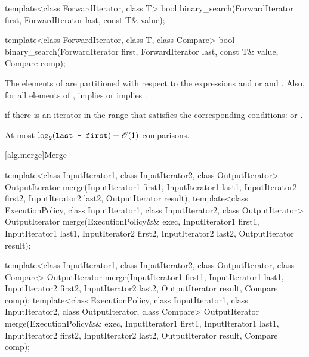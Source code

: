 %
\begin{itemdecl}
template<class ForwardIterator, class T>
  bool binary_search(ForwardIterator first, ForwardIterator last,
                     const T& value);

template<class ForwardIterator, class T, class Compare>
  bool binary_search(ForwardIterator first, ForwardIterator last,
                     const T& value, Compare comp);
\end{itemdecl}

\begin{itemdescr}
\pnum
\requires
The elements
of
are partitioned with respect to the expressions
and
or
and
.
Also, for all elements
of
\tcode{[first, last)},
implies
or
implies
.

\pnum
\returns
{}
if there is an iterator
in the range
that satisfies the corresponding conditions:
or
.

\pnum
\complexity
At most
$\log_2(\texttt{last - first}) + \mathscr{O}(1)$
comparisons.
\end{itemdescr}

[alg.merge]{Merge}

%
\begin{itemdecl}
template<class InputIterator1, class InputIterator2,
         class OutputIterator>
  OutputIterator
    merge(InputIterator1 first1, InputIterator1 last1,
          InputIterator2 first2, InputIterator2 last2,
          OutputIterator result);
template<class ExecutionPolicy, class InputIterator1, class InputIterator2,
         class OutputIterator>
  OutputIterator
    merge(ExecutionPolicy&& exec,
          InputIterator1 first1, InputIterator1 last1,
          InputIterator2 first2, InputIterator2 last2,
          OutputIterator result);

template<class InputIterator1, class InputIterator2,
         class OutputIterator, class Compare>
  OutputIterator
    merge(InputIterator1 first1, InputIterator1 last1,
          InputIterator2 first2, InputIterator2 last2,
          OutputIterator result, Compare comp);
template<class ExecutionPolicy, class InputIterator1, class InputIterator2,
         class OutputIterator, class Compare>
  OutputIterator
    merge(ExecutionPolicy&& exec,
          InputIterator1 first1, InputIterator1 last1,
          InputIterator2 first2, InputIterator2 last2,
          OutputIterator result, Compare comp);
\end{itemdecl}

